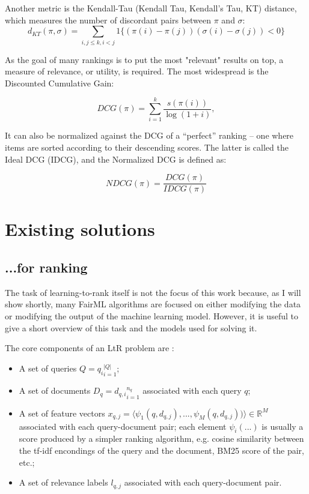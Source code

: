 Another metric is the Kendall-Tau (Kendall Tau, Kendall's Tau, KT) distance, which measures the number of discordant pairs between $\pi$ and $\sigma$:
\begin{equation*}\label{eq:kt}
d_{KT}(\pi, \sigma) = \sum_{i,j \leq k, i < j} 1\{ (\pi(i) - \pi(j))(\sigma(i) - \sigma(j)) < 0 \}
\end{equation*}

As the goal of many rankings is to put the most "relevant" results on top, a measure of relevance, or utility, is required. The most widespread is the Discounted Cumulative Gain:

\[ DCG(\pi) = \sum_{i=1}^k \frac{s(\pi(i))}{\log(1+i)}, \]

It can also be normalized against the DCG of a “perfect” ranking – one where items are sorted according to their descending scores. The latter is called the Ideal DCG (IDCG), and the Normalized DCG is defined as:

\[NDCG(\pi) = \frac{DCG(\pi)}{IDCG(\pi)}\]

\section{Existing solutions}\label{sect:int_3}

\subsection{...for ranking}

The task of learning-to-rank itself is not the focus of this work because, as I will show shortly, many FairML algorithms are focused on either modifying the data or modifying the output of the machine learning model. However, it is useful to give a short overview of this task and the models used for solving it. 

The core components of an LtR problem are \cite{Qin2010LETORAB}:
\begin{itemize}
\item A set of queries $Q = {q_i}_{i=1}^{|Q|}$;
\item A set of documents $D_q = {d_{q,i}}_{i=1}^{n_q}$ associated with each query $q$;
\item A set of feature vectors $x_{q,j} = \langle \psi_1 (q, d_{q,j}), ..., \psi_M (q, d_{q,j})) \rangle \in \mathbb{R}^M$ associated with each query-document pair; each element $\psi_i (...)$ is usually a score produced by a simpler ranking algorithm, e.g. cosine similarity between the tf-idf encondings of the query and the document, BM25 score of the pair, etc.;
\item A set of relevance labels $l_{q,j}$ associated with each query-document pair.
\end{itemize}

